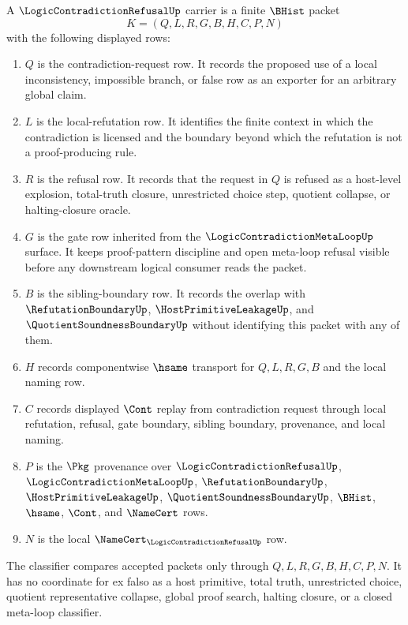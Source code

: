 \begin{definition}
\label{def:logic-contradiction-refusal-carrier}
A $\LogicContradictionRefusalUp$ carrier is a finite $\BHist$ packet
$$
K=(Q,L,R,G,B,H,C,P,N)
$$
with the following displayed rows:
\begin{enumerate}
\item $Q$ is the contradiction-request row. It records the proposed use of a local inconsistency, impossible branch, or false row as an exporter for an arbitrary global claim.
\item $L$ is the local-refutation row. It identifies the finite context in which the contradiction is licensed and the boundary beyond which the refutation is not a proof-producing rule.
\item $R$ is the refusal row. It records that the request in $Q$ is refused as a host-level explosion, total-truth closure, unrestricted choice step, quotient collapse, or halting-closure oracle.
\item $G$ is the gate row inherited from the $\LogicContradictionMetaLoopUp$ surface. It keeps proof-pattern discipline and open meta-loop refusal visible before any downstream logical consumer reads the packet.
\item $B$ is the sibling-boundary row. It records the overlap with $\RefutationBoundaryUp$, $\HostPrimitiveLeakageUp$, and $\QuotientSoundnessBoundaryUp$ without identifying this packet with any of them.
\item $H$ records componentwise $\hsame$ transport for $Q,L,R,G,B$ and the local naming row.
\item $C$ records displayed $\Cont$ replay from contradiction request through local refutation, refusal, gate boundary, sibling boundary, provenance, and local naming.
\item $P$ is the $\Pkg$ provenance over $\LogicContradictionRefusalUp$, $\LogicContradictionMetaLoopUp$, $\RefutationBoundaryUp$, $\HostPrimitiveLeakageUp$, $\QuotientSoundnessBoundaryUp$, $\BHist$, $\hsame$, $\Cont$, and $\NameCert$ rows.
\item $N$ is the local $\NameCert_{\LogicContradictionRefusalUp}$ row.
\end{enumerate}
The classifier compares accepted packets only through $Q,L,R,G,B,H,C,P,N$. It has no coordinate for ex falso as a host primitive, total truth, unrestricted choice, quotient representative collapse, global proof search, halting closure, or a closed meta-loop classifier.
\end{definition}

